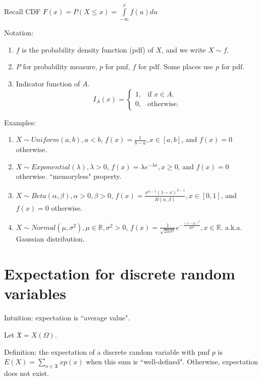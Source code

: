 \documentclass[12pt]{article}
\begin{document}
Recall CDF $F(x)=P(X\le x)=\int\limits_{-\infty}^{x} f(u)du$
\bigbreak

Notation:
\begin{enumerate}
    \item $f$ is the probability density function (pdf) of $X$, and 
        we write $X\sim f$.

    \item $P$ for probability measure, $p$ for pmf, $f$ for pdf. Some places use $p$ for pdf.

    \item Indicator function of $A$.
        \begin{equation}
            I_{A}(x)=\begin{cases}
                1, & \text{if $x\in A$}. \\
                0, & \text{otherwise}.
            \end{cases}
        \end{equation}
\end{enumerate}
\bigbreak

Examples:
\begin{enumerate}
    \item $X\sim Uniform(a,b), a<b$, $f(x)=\frac{1}{b-a}, x\in[a,b]$, and $f(x)=0$ otherwise.

    \item $X\sim Exponential(\lambda),\lambda>0$, $f(x)=\lambda e^{-\lambda x},x\ge 0$, and $f(x)=0$ otherwise. ``memoryless" property.

    \item $X\sim Beta(\alpha,\beta),\alpha>0,\beta>0$, $f(x)=\frac{x^{\alpha - 1}(1-x)^{\beta - 1}}{B(\alpha,\beta)},x\in[0,1]$,
        and $f(x)=0$ otherwise.

    \item $X\sim Normal(\mu,\sigma^2),\mu\in \mathbb{R},\sigma^2>0$, 
        $f(x)=\frac{1}{\sqrt{2\pi\sigma^2}}e^{-\frac{(x-\mu)^2}{2\sigma^2}},x\in\mathbb{R}$. a.k.a. Gaussian distribution.
\end{enumerate}

\section{Expectation for discrete random variables}

Intuition: expectation is ``average value".

Let $\mathfrak{X}=X(\Omega)$.

Definition: the expectation of a discrete random variable with pmf $p$ is
$E(X)=\sum\limits_{x\in\mathfrak{X}} xp(x)$ when this sum is ``well-defined".
Otherwise, expectation does not exist.
\bigbreak
\end{document}
